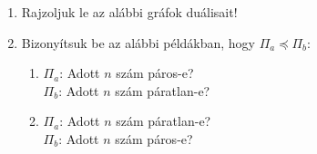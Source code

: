 \documentclass[a4paper, 12pt]{article}
\begin{document}
        \noindent{}
        \noindent{}
        
        
        \begin{enumerate}
            \item Rajzoljuk le az alábbi gráfok duálisait!
            \begin{figure}[ht]
                \centering
                \begin{subfigure}{0.2\textwidth}
                    \centering
                    
                    \caption{}
                \end{subfigure}
                \begin{subfigure}{0.2\textwidth}
                    \centering
                    
                    \caption{}
                \end{subfigure}
                \begin{subfigure}{0.2\textwidth}
                    \centering
                    
                    \caption{}
                \end{subfigure}
                \begin{subfigure}{0.2\textwidth}
                    \centering
                    
                    \caption{}
                \end{subfigure}
            \end{figure}

            \item Bizonyítsuk be az alábbi példákban, hogy $\Pi_a \preceq \Pi_b$:
            \begin{enumerate}
                \item $\Pi_a$: Adott $n$ szám páros-e? \\
                $\Pi_b$: Adott $n$ szám páratlan-e?

                \item $\Pi_a$: Adott $n$ szám páratlan-e? \\
                $\Pi_b$: Adott $n$ szám páros-e?


\end{enumerate}
\end{enumerate}
\end{document}
